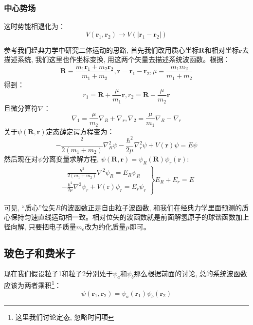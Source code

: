 \documentclass[a4paper,zihao=-4,linespread=1]{ctexrep}
\begin{document}
    \subsubsection*{中心势场}
    这时势能相退化为：
    \[V(\mathbf{r}_1,\mathbf{r}_2)\rightarrow V(\left|\mathbf{r}_1-\mathbf{r}_2\right|)\]
    
    参考我们经典力学中研究二体运动的思路, 首先我们改用质心坐标$\mathbf{R}$和相对坐标$\mathbf{r}$去描述系统, 我们这里也作坐标变换, 用这两个矢量去描述系统波函数。根据：
    \[\mathbf{R}\equiv\frac{m_1\mathbf{r}_1+m_2\mathbf{r}_2}{m_1+m_2},\mathbf{r}=\mathbf{r}_1-\mathbf{r}_2,\mu\equiv\frac{m_1m_2}{m_1+m_2}\]
    得到：
    \[r_1=\mathbf{R}+\frac{\mu}{m_1}\mathbf{r},r_2=\mathbf{R}-\frac{\mu}{m_2}\mathbf{r}\]
    且微分算符$\nabla$：
    \[\nabla_1=\frac{\mu}{m_2}\nabla_R+\nabla_r,\nabla_2=\frac{\mu}{m_1}\nabla_R-\nabla_r\]
    关于$\psi(\mathbf{R},\mathbf{r})$定态薛定谔方程变为：
    \begin{equation}
        -\frac{^2}{2(m_1+m_2)}\nabla_R^2\psi-\frac{\hbar^2}{2\mu}\nabla_r^2\psi+V(\mathbf{r})\psi=E\psi
    \end{equation}
    然后现在对$\psi$分离变量求解方程, $\psi(\mathbf{R},\mathbf{r})=\psi_R(\mathbf{R})\psi_r(\mathbf{r})$:
    \begin{align*}
        \left.\begin{array}{r}
            -\frac{\hbar^{2}}{2\left(m_{1}+m_{2}\right)} \nabla^{2} \psi_{R}=E_{R} \psi_{R} \\ 
           -\frac{\hbar^{2}}{2 \mu} \nabla^{2} \psi_{r}+V(\mathrm{r}) \psi_{r}=E_{r} \psi_{r}
          \end{array}\right\}E_R+E_r=E
    \end{align*}

    可见, “质心”位矢$R$的波函数正是自由粒子波函数, 和我们在经典力学里面预测的质心保持匀速直线运动相一致。相对位矢的波函数就是前面解氢原子的球谐函数加上径向解, 只要把电子质量$m_e$改为约化质量$\mu$即可。
    \subsection{玻色子和费米子}
    现在我们假设粒子1和粒子2分别处于$\psi_a$和$\psi_b$那么根据前面的讨论, 总的系统波函数应该为两者乘积\footnote{这里我们讨论定态, 忽略时间项}：
    \begin{equation}
        \label{eq:5.5}
        \psi(\mathbf{r}_1,\mathbf{r}_2)=\psi_a(\mathbf{r}_1)\psi_b(\mathbf{r}_2)
    \end{equation}  
    
\end{document}
